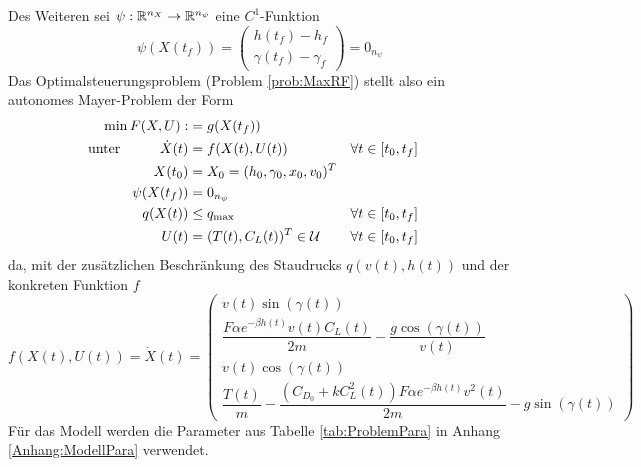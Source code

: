 Des Weiteren sei $\psi : \mathbb{R}^{n_X} \to \mathbb{R}^{n_{\psi}}$ eine $C^1$-Funktion
\[\psi(X(t_f)) = 
\begin{pmatrix}
    h(t_f) - h_f \\ 
    \gamma(t_f) - \gamma_f
\end{pmatrix} = 0_{n_{\psi}}\]
Das Optimalsteuerungsproblem (Problem \ref{prob:MaxRF}) stellt also ein autonomes Mayer-Problem der Form 
\begin{equation} \label{equ:mayer_problem}
    \begin{aligned}
        \min F(X,U) :&= g(X(t_f))  \\
        \text{unter}  \hspace{10mm} \dot{X}(t) &= f(X(t),U(t)) & & \forall t \in [t_0,t_f] \\
        X(t_0) &= X_0 = (h_0,\gamma_0,x_0,v_0)^T & & \\
        \psi(X(t_f)) &= 0_{n_{\psi}} & & \\
        q(X(t)) &\leq q_{\max} & & \forall t \in [t_0,t_f] \\
        U(t) &= (T(t),C_L(t))^T \in \mathcal{U}  & & \forall t \in [t_0,t_f] 
    \end{aligned}
\end{equation}
da, mit der zusätzlichen Beschränkung des Staudrucks $q(v(t),h(t))$ und der konkreten Funktion $f$
\begin{equation} \label{equ:state_space}
    f(X(t),U(t)) = \dot{X}(t) = \begin{pmatrix}
        v(t) \sin(\gamma(t)) \\ 
        \dfrac{F \alpha e^{-\beta h(t)} v(t) C_L(t)}{2m} - \dfrac{g \cos(\gamma(t))}{v(t)} \\ 
        v(t) \cos(\gamma(t)) \\ 
        \dfrac{T(t)}{m} - \dfrac{(C_{D_0} + k C_L^2(t)) F \alpha e^{-\beta h(t)} v^2(t)}{2m} - g \sin(\gamma(t))
    \end{pmatrix}
\end{equation}
Für das Modell werden die Parameter aus Tabelle \ref{tab:ProblemPara} in Anhang \ref{Anhang:ModellPara} verwendet.
